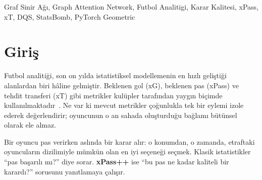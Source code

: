 \documentclass[conference]{IEEEtran}
\begin{document}
\maketitle

\begin{abstract}
Bu çalışmada, futbolda pas ve şut kararlarının kalitesini ölçen \textbf{xPass++} adlı
bir Graf Sinir Ağı (Graph Neural Network, GNN) sistemi tasarlanmış ve geliştirilmiştir.
FIFA 2022 Dünya Kupası verisi (StatsBomb Open Data) üzerinde, 360$^\circ$ dondurulmuş
kare (freeze-frame) girdileri ve xT-delta denetimli hedef kullanılarak eğitilen model,
sahadaki oyuncu etkileşimlerini graf yapısıyla modellemektedir.
Nihai \textbf{Karar Kalitesi Skoru (Decision Quality Score, DQS)} = kapalı-form xT-temeli
+ Graf Dikkat Ağı (Graph Attention Network, GAT) tarafından tahmin edilen artık değer
formülüyle hesaplanmaktadır.
Test bölümünde ($n = 7.394$) xT-temeli baseline'a kıyasla MAE'de \textbf{\%10.5},
MSE'de \textbf{\%32} iyileşme elde edilmiştir. Model 3 GAT katmanı, 4 dikkat kafası ve
128 gizli boyut içermekte; toplam $\approx$211.000 parametreye sahip bulunmaktadır.
\end{abstract}

\begin{IEEEkeywords}
Graf Sinir Ağı, Graph Attention Network, Futbol Analitigi, Karar Kalitesi, xPass, xT,
DQS, StatsBomb, PyTorch Geometric
\end{IEEEkeywords}

\section{Giriş}

Futbol analitiği, son on yılda istatistiksel modellemenin en hızlı geliştiği alanlardan
biri hâline gelmiştir. Beklenen gol (xG), beklenen pas (xPass) ve tehdit transferi (xT)
gibi metrikler kulüpler tarafından yaygın biçimde kullanılmaktadır~\cite{fernandez2019decomposing}.
Ne var ki mevcut metrikler çoğunlukla tek bir eylemi izole ederek değerlendirir;
oyuncunun o an sahada oluşturduğu bağlamı bütünsel olarak ele almaz.

Bir oyuncu pas verirken aslında bir karar alır: o konumdan, o zamanda, etraftaki
oyuncuların dizilimiyle mümkün olan en iyi seçeneği seçmek. Klasik istatistikler
``pas başarılı mı?'' diye sorar. \textbf{xPass++} ise ``bu pas ne kadar kaliteli bir
karardı?'' sorusunu yanıtlamaya çalışır.
\end{document}
